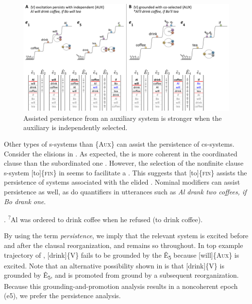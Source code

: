   
\begin{figure}
\includegraphics[width=\textwidth]{figures/Tilsen-img148.png}
\caption{Assisted persistence from an auxiliary system is stronger when the auxiliary is independently selected.}
\label{fig:7:4}
\end{figure}
 

  Other types of s-systems than \{A\textsc{ux}\} can assist the persistence of cs-systems. Consider the  elisions in . As expected, the  is more coherent in the coordinated clause  than the subordinated one . However, the selection of the nonfinite clause s-system [to]\{\textsc{fin}\} in  seems to facilitate a . This suggests that [to]\{\textsc{fin}\} assists the persistence of systems associated with the elided . Nominal modifiers can assist persistence as well, as do quantifiers in utterances such as \textit{Al drank two coffees, if Bo drank one}.

\ea\label{ex:7:6}
.\label{ex:7:6a}
\ex\textsuperscript{?}{Al was ordered to drink coffee when he refused (to drink coffee)}.\label{ex:7:6b}
\label{ex:7:6c}
\z
\z

  By using the term \textit{persistence}, we imply that the relevant system is excited before and after the clausal reorganization, and remains so throughout. In top example trajectory of {}, [drink]\{V\} fails to be grounded by the  Ê\textsubscript{5} because [will]\{A\textsc{ux}\} is excited. Note that an alternative possibility shown in {} is that [drink]\{V\} is grounded by Ê\textsubscript{5},\textsubscript{} and is promoted from ground by a subsequent reorganization. Because this grounding-and-promotion analysis results in a noncoherent epoch (e5), we prefer the persistence analysis.


